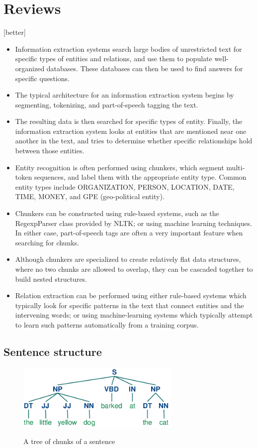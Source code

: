 \documentclass[LaM,binding=0.6cm]{sapthesis}
\begin{document}
\section{Reviews}
[better]
\begin{itemize}
   \item Information extraction systems search large bodies of unrestricted text for specific types of entities and relations, and use them to populate well-organized databases. These databases can then be used to find answers for specific questions.
   \item The typical architecture for an information extraction system begins by segmenting, tokenizing, and part-of-speech tagging the text. 
   \item The resulting data is then searched for specific types of entity. Finally, the information extraction system looks at entities that are mentioned near one another in the text, and tries to determine whether specific relationships hold between those entities.
   \item Entity recognition is often performed using chunkers, which segment multi-token sequences, and label them with the appropriate entity type. Common entity types include ORGANIZATION, PERSON, LOCATION, DATE, TIME, MONEY, and GPE (geo-political entity).
   \item Chunkers can be constructed using rule-based systems, such as the RegexpParser class provided by NLTK; or using machine learning techniques. In either case, part-of-speech tags are often a very important feature when searching for chunks.
   \item Although chunkers are specialized to create relatively flat data structures, where no two chunks are allowed to overlap, they can be cascaded together to build nested structures.
   \item Relation extraction can be performed using either rule-based systems which typically look for specific patterns in the text that connect entities and the intervening words; or using machine-learning systems which typically attempt to learn such patterns automatically from a training corpus.
\end{itemize}

\subsection{Sentence structure}

\begin{figure}
\centering
\includegraphics[width=0.7\textwidth]{pictures/chunktree.png}\\[3ex]
\caption{A tree of chunks of a sentence}
\label{fig:chunktree}
\end{figure}
\end{document}
